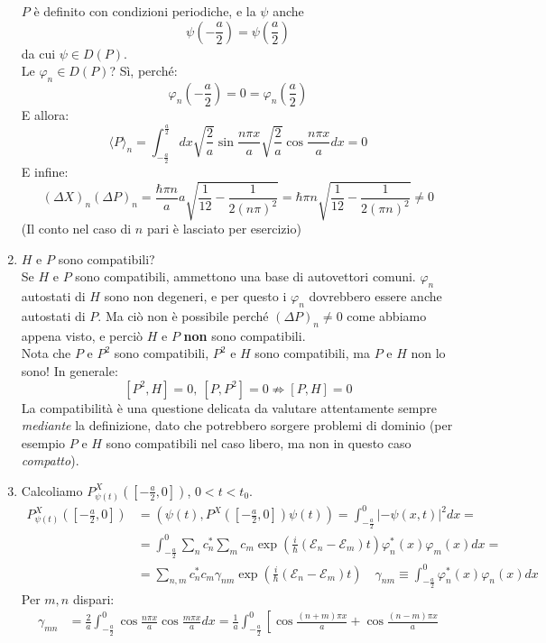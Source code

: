 \documentclass[../../FisicaTeorica.tex]{subfiles}
\begin{document}
\begin{enumerate}
\[\]
$P$ è definito con condizioni periodiche, e la $\psi$ anche
\[
\psi\left(-\frac{a}{2}\right)=\psi\left(\frac{a}{2}\right)
\]
da cui $\psi \in D(P)$.\\
Le $\varphi_n \in D(P)$? Sì, perché:
\[
\varphi_n\left(-\frac{a}{2}\right)=0=\varphi_n\left(\frac{a}{2}\right)
\]
E allora:
\[
\langle P \rangle_n = \int_{-\frac{a}{2}}^{\frac{a}{2}} dx \sqrt{\frac{2}{a}}\sin\frac{n\pi x}{a}\sqrt{\frac{2}{a}}\cos \frac{n\pi x}{a} dx=0
\]
E infine:
\[
(\Delta X)_n(\Delta P)_n = \frac{\hbar \pi n}{a} a \sqrt{\frac{1}{12}-\frac{1}{2(n\pi)^2}}=\hbar \pi n \sqrt{\frac{1}{12}-\frac{1}{2(\pi n)^2}} \neq 0
\]
(Il conto nel caso di $n$ pari è lasciato per esercizio)
\item $H$ e $P$ sono compatibili?\\
Se $H$ e $P$ sono compatibili, ammettono una base di autovettori comuni. $\varphi_n$ autostati di $H$ sono non degeneri, e per questo i $\varphi_n$ dovrebbero essere anche autostati di $P$. Ma ciò non è possibile perché $(\Delta P)_n \neq 0$ come abbiamo appena visto, e perciò $H$ e $P$ \textbf{non} sono compatibili.\\
Nota che $P$ e $P^2$ sono compatibili, $P^2$ e $H$ sono compatibili, ma $P$ e $H$ non lo sono! In generale:
\[
[P^2, H]=0, \> [P,P^2]=0 \not\Rightarrow [P,H]=0
\]
La compatibilità è una questione delicata da valutare attentamente sempre \textit{mediante} la definizione, dato che potrebbero sorgere problemi di dominio (per esempio $P$ e $H$ sono compatibili nel caso libero, ma non in questo caso \textit{compatto}).
\item Calcoliamo $P_{\psi(t)}^X \left(\left[-\frac{a}{2},0\right]\right)$, $0<t<t_0$.
\begin{align*}
P_{\psi(t)}^X \left(\left[-\frac{a}{2},0\right]\right) &= \left(\psi(t), P^X\left(\left[-\frac{a}{2},0\right]\right)\psi(t)\right)=\int_{-\frac{a}{2}}^{0} |-\psi(x,t)|^2 dx=\\
&= \int_{-\frac{a}{2}}^0 \sum_n c_n^* \sum_m c_m \exp\left(\frac{i}{\hbar}(\mathcal{E}_n-\mathcal{E}_m)t\right)\varphi_n^*(x)\varphi_m(x)dx=\\
&=\sum_{n,m}c_n^* c_m \gamma_{nm}\exp\left(\frac{i}{\hbar}(\mathcal{E}_n-\mathcal{E}_m)t\right) \quad \gamma_{nm}\equiv \int_{-\frac{a}{2}}^0 \varphi_n^*(x) \varphi_n(x) dx 
\end{align*}
Per $m,n$ dispari:
\begin{align*}
\gamma_{mn}&=\frac{2}{a}\int_{-\frac{a}{2}}^0 \cos \frac{n\pi x}{a}\cos \frac{m\pi x}{a}dx=\frac{1}{a}\int_{-\frac{a}{2}}^{0} \left[
\cos\frac{(n+m)\pi x}{a}+ \cos\frac{(n-m)\pi x}{a}

\end{align*}
\end{enumerate}
\end{document}
